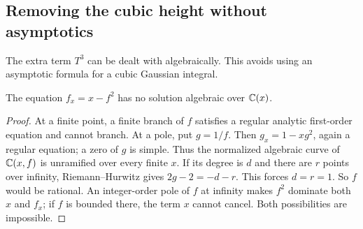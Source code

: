 \subsection{Removing the cubic height without asymptotics}\label{sec:airyformal}

The extra term $T^3$ can be dealt with algebraically. This avoids
using an asymptotic formula for a cubic Gaussian integral.

\begin{lemma}\label{lem:airyriccati}
The equation $f_x=x-f^2$ has no solution algebraic over $\mathbb C(x)$.
\end{lemma}
\begin{proof}
At a finite point, a finite branch of $f$ satisfies a regular analytic
first-order equation and cannot branch. At a pole, put $g=1/f$.
Then $g_x=1-xg^2$, again a regular equation; a zero of $g$ is simple.
Thus the normalized algebraic curve of $\mathbb C(x,f)$ is unramified over
every finite $x$. If its degree is $d$ and there are $r$ points over
infinity, Riemann--Hurwitz gives $2g-2=-d-r$. This forces $d=r=1$.
So $f$ would be rational. An integer-order pole of $f$ at infinity
makes $f^2$ dominate both $x$ and $f_x$; if $f$ is bounded there,
the term $x$ cannot cancel. Both possibilities are impossible.
\end{proof}


